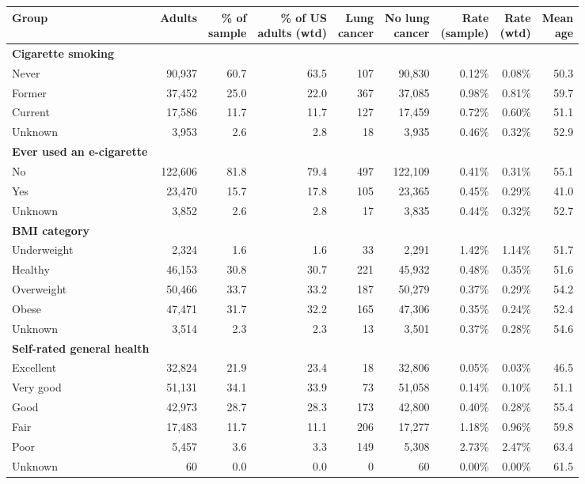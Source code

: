 \begin{tabular*}{\textwidth}{@{\extracolsep{\fill}}lrrrrrrrr}
\toprule
Group & Adults & \makecell[b]{\% of\\{}sample} & \makecell[b]{\% of US\\{}adults (wtd)} & \makecell[b]{Lung\\{}cancer} & \makecell[b]{No lung\\{}cancer} & \makecell[b]{Rate\\{}(sample)} & \makecell[b]{Rate\\{}(wtd)} & \makecell[b]{Mean\\{}age} \\
\midrule
\textbf{Cigarette smoking} &  &  &  &  &  &  &  &  \\
\quad Never & 90,937 & 60.7 & 63.5 & 107 & 90,830 & 0.12\% & 0.08\% & 50.3 \\
\quad Former & 37,452 & 25.0 & 22.0 & 367 & 37,085 & 0.98\% & 0.81\% & 59.7 \\
\quad Current & 17,586 & 11.7 & 11.7 & 127 & 17,459 & 0.72\% & 0.60\% & 51.1 \\
\quad Unknown & 3,953 & 2.6 & 2.8 & 18 & 3,935 & 0.46\% & 0.32\% & 52.9 \\
\midrule
\textbf{Ever used an e-cigarette} &  &  &  &  &  &  &  &  \\
\quad No & 122,606 & 81.8 & 79.4 & 497 & 122,109 & 0.41\% & 0.31\% & 55.1 \\
\quad Yes & 23,470 & 15.7 & 17.8 & 105 & 23,365 & 0.45\% & 0.29\% & 41.0 \\
\quad Unknown & 3,852 & 2.6 & 2.8 & 17 & 3,835 & 0.44\% & 0.32\% & 52.7 \\
\midrule
\textbf{BMI category} &  &  &  &  &  &  &  &  \\
\quad Underweight & 2,324 & 1.6 & 1.6 & 33 & 2,291 & 1.42\% & 1.14\% & 51.7 \\
\quad Healthy & 46,153 & 30.8 & 30.7 & 221 & 45,932 & 0.48\% & 0.35\% & 51.6 \\
\quad Overweight & 50,466 & 33.7 & 33.2 & 187 & 50,279 & 0.37\% & 0.29\% & 54.2 \\
\quad Obese & 47,471 & 31.7 & 32.2 & 165 & 47,306 & 0.35\% & 0.24\% & 52.4 \\
\quad Unknown & 3,514 & 2.3 & 2.3 & 13 & 3,501 & 0.37\% & 0.28\% & 54.6 \\
\midrule
\textbf{Self-rated general health} &  &  &  &  &  &  &  &  \\
\quad Excellent & 32,824 & 21.9 & 23.4 & 18 & 32,806 & 0.05\% & 0.03\% & 46.5 \\
\quad Very good & 51,131 & 34.1 & 33.9 & 73 & 51,058 & 0.14\% & 0.10\% & 51.1 \\
\quad Good & 42,973 & 28.7 & 28.3 & 173 & 42,800 & 0.40\% & 0.28\% & 55.4 \\
\quad Fair & 17,483 & 11.7 & 11.1 & 206 & 17,277 & 1.18\% & 0.96\% & 59.8 \\
\quad Poor & 5,457 & 3.6 & 3.3 & 149 & 5,308 & 2.73\% & 2.47\% & 63.4 \\
\quad Unknown & 60 & 0.0 & 0.0 & 0 & 60 & 0.00\% & 0.00\% & 61.5 \\
\bottomrule
\end{tabular*}
